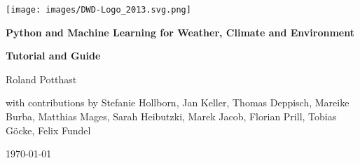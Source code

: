 \documentclass[11pt,oneside]{book} %
\begin{document}
\frontmatter
\begin{titlepage}
	\begin{flushright}
    \texttt{[image: images/DWD-Logo\_2013.svg.png]}
	\end{flushright}

  \centering
	\vspace{4cm}
  
  {\Huge\bfseries Python and Machine Learning for Weather, Climate and Environment \par}
  \vspace{1cm}
  
  {\Large\bfseries Tutorial and Guide\par}
  \vspace{2cm}
  
  {\Large Roland Potthast \par 
	
	with contributions by Stefanie Hollborn, Jan Keller, Thomas Deppisch, Mareike Burba, Matthias Mages, Sarah Heibutzki, Marek Jacob, Florian Prill, Tobias Göcke, Felix Fundel \par}
  \vfill
  {\Large \today\par}
\end{titlepage}

\tableofcontents

\frontmatter
\renewcommand{\thechapter}{\Roman{chapter}}
\renewcommand{\thesection}{\thechapter\Roman{section}} %


\renewcommand{\thechapter}{\arabic{chapter}}
\renewcommand{\thesection}{\arabic{chapter}.\arabic{section}}

\mainmatter


\end{document}
